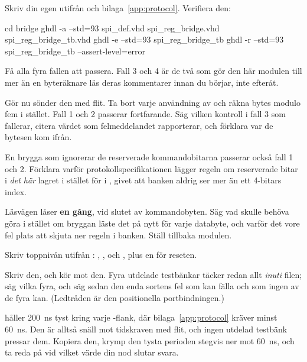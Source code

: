 \label{c19:ex:bridge}
Skriv din egen  utifrån  och
bilaga~\ref{app:protocol}. Verifiera den:

\begin{shell}
cd bridge
ghdl -a --std=93 spi_def.vhd spi_reg_bridge.vhd spi_reg_bridge_tb.vhd
ghdl -e --std=93 spi_reg_bridge_tb
ghdl -r --std=93 spi_reg_bridge_tb --assert-level=error
\end{shell}

 Få alla fyra fallen att passera. Fall 3 och 4 är de två som gör den här modulen till mer än
en byteräknare \textemdash{} läs deras kommentarer innan du börjar, inte efteråt.

 Gör nu sönder den med flit. Ta bort varje användning av  och räkna bytes
modulo fem i stället. Fall 1 och 2 passerar fortfarande. Säg vilken kontroll i fall 3 som fallerar,
citera värdet som felmeddelandet rapporterar, och förklara var de bytesen kom ifrån.

 En brygga som ignorerar de reserverade kommandobitarna passerar också fall 1 och 2.
Förklara varför protokollspecifikationen lägger regeln om reserverade bitar i \emph{det här} lagret i
stället för i , givet att banken aldrig ser mer än ett 4-bitars index.

 Läsvägen låser  \textbf{en gång}, vid slutet av kommandobyten. Säg vad
 skulle behöva göra i stället om bryggan läste det på nytt för varje databyte, och
varför det vore fel plats att skjuta ner regeln i banken. Ställ tillbaka modulen.

\label{c19:ex:node}
Skriv toppnivån utifrån : , ,
 och , plus en  för reseten.

 Skriv den, och kör  mot den. Fyra utdelade testbänkar täcker redan
allt \emph{inuti} filen; säg vilka fyra, och säg sedan den enda sortens fel som
 kan fälla och som ingen av de fyra kan. (Ledtråden är den positionella
portbindningen.)

  håller 200~ns tyst kring varje -flank, där
bilaga~\ref{app:protocol} kräver minst 60~ns. Den är alltså snäll mot tidskraven med flit, och ingen
utdelad testbänk pressar dem. Kopiera den, krymp den tysta perioden stegvis ner mot 60~ns, och ta
reda på vid vilket värde din nod slutar svara.

